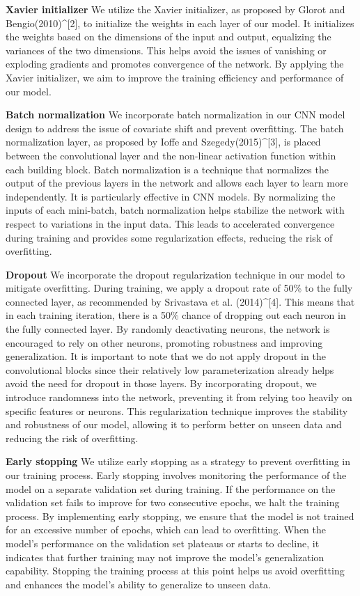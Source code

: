 \documentclass{article}
\begin{document}
\textbullet \textbf{Xavier initializer}
We utilize the Xavier initializer, as proposed by Glorot and Bengio(2010)^{[2]}, to initialize the weights in each layer of our model. It initializes the weights based on the dimensions of the input and output, equalizing the variances of the two dimensions. This helps avoid the issues of vanishing or exploding gradients and promotes convergence of the network. By applying the Xavier initializer, we aim to improve the training efficiency and performance of our model.

\textbullet \textbf{Batch normalization}
We incorporate batch normalization in our CNN model design to address the issue of covariate shift and prevent overfitting. The batch normalization layer, as proposed by Ioffe and Szegedy(2015)^{[3]}, is placed between the convolutional layer and the non-linear activation function within each building block. Batch normalization is a technique that normalizes the output of the previous layers in the network and allows each layer to learn more independently. It is particularly effective in CNN models. By normalizing the inputs of each mini-batch, batch normalization helps stabilize the network with respect to variations in the input data. This leads to accelerated convergence during training and provides some regularization effects, reducing the risk of overfitting.

\textbullet \textbf{Dropout}
We incorporate the dropout regularization technique in our model to mitigate overfitting. During training, we apply a dropout rate of 50\% to the fully connected layer, as recommended by Srivastava et al. (2014)^{[4]}. This means that in each training iteration, there is a 50\% chance of dropping out each neuron in the fully connected layer. By randomly deactivating neurons, the network is encouraged to rely on other neurons, promoting robustness and improving generalization. It is important to note that we do not apply dropout in the convolutional blocks since their relatively low parameterization already helps avoid the need for dropout in those layers. By incorporating dropout, we introduce randomness into the network, preventing it from relying too heavily on specific features or neurons. This regularization technique improves the stability and robustness of our model, allowing it to perform better on unseen data and reducing the risk of overfitting.

\textbullet \textbf{Early stopping}
We utilize early stopping as a strategy to prevent overfitting in our training process. Early stopping involves monitoring the performance of the model on a separate validation set during training. If the performance on the validation set fails to improve for two consecutive epochs, we halt the training process. By implementing early stopping, we ensure that the model is not trained for an excessive number of epochs, which can lead to overfitting. When the model's performance on the validation set plateaus or starts to decline, it indicates that further training may not improve the model's generalization capability. Stopping the training process at this point helps us avoid overfitting and enhances the model's ability to generalize to unseen data.
\end{document}
